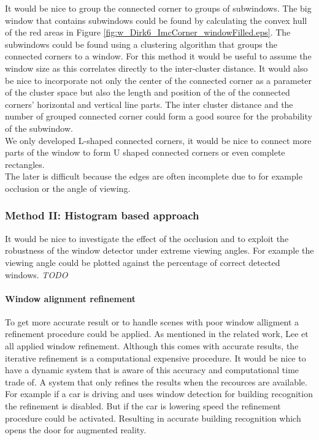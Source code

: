 It would be nice to group the connected corner to groups of subwindows.
The big window that contains subwindows could be found by calculating the convex hull of the red areas in 
Figure \ref{fig:w_Dirk6_ImcCorner_windowFilled.eps}.
The subwindows could be found using a clustering algorithm that groups the connected corners to
a window. For this method it would be useful to assume the window size as this
correlates directly to the inter-cluster distance.
It would also be nice to incorporate not only the center of the connected corner
as a parameter of the cluster space but also the length and position of the of
the connected corners' horizontal and vertical line parts.  The inter cluster
distance and the number of grouped connected corner could form a good source for
the probability of the subwindow.\\

We only developed L-shaped connected corners, it would be nice to connect more
parts of the window to form U shaped connected corners or even complete rectangles.\\
The later is difficult because the edges are often incomplete due to for example occlusion 
or the angle of viewing.


\subsubsection{Method II: Histogram based approach} 
It would be nice to investigate the effect of the occlusion and to exploit the
robustness of the window detector under extreme viewing angles.
For example the viewing angle could be plotted against the percentage of
correct detected windows.
\emph{TODO}


\paragraph{Window alignment refinement}
To get more accurate result or to handle scenes with poor window alligment a refinement procedure could be applied.
As mentioned in the related work, Lee et all \cite{Lee_extraction} applied window refinement.
Although this comes with accurate results, the iterative refinement is a
computational expensive procedure. 
It would be nice to have a dynamic system that is aware of this 
accuracy and computational time trade of. A system that only refines the results when the recources are available.
For example if a car is driving and uses window detection for building recognition the refinement is disabled.
But if the car is lowering speed the refinement procedure could be activated.
Resulting in accurate building recognition which opens the door for augmented reality.

